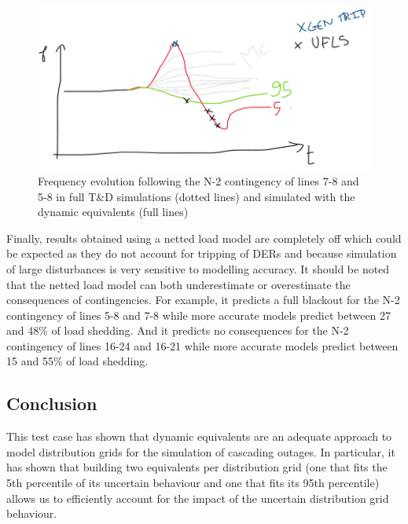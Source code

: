 \begin{figure}
    \centering
    \includegraphics[width=0.8\linewidth]{Figs/isgt_frequency.png}
    \caption{Frequency evolution following the N-2 contingency of lines 7-8 and 5-8 in full T\&D simulations (dotted lines) and simulated with the dynamic equivalents (full lines)}
    \label{fig:isgt_frequency}
\end{figure}

Finally, results obtained using a netted load model are completely off which could be expected as they do not account for tripping of DERs and because simulation of large disturbances is very sensitive to modelling accuracy. It should be noted that the netted load model can both underestimate or overestimate the consequences of contingencies. For example, it predicts a full blackout for the N-2 contingency of lines 5-8 and 7-8 while more accurate models predict between 27 and 48\% of load shedding. And it predicts no consequences for the N-2 contingency of lines 16-24 and 16-21 while more accurate models predict between 15 and 55\% of load shedding.


\subsection{Conclusion}


This test case has shown that dynamic equivalents are an adequate approach to model distribution grids for the simulation of cascading outages. In particular, it has shown that building two equivalents per distribution grid (one that fits the 5th percentile of its uncertain behaviour and one that fits its 95th percentile) allows us to efficiently account for the impact of the uncertain distribution grid behaviour.

